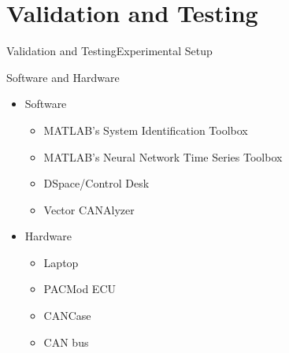 \documentclass{beamer}
\begin{document}
\section{Validation and Testing}

\begin{frame}{Validation and Testing}{Experimental Setup}
  \begin{block}{Software and Hardware}
 \begin{itemize}
        \item Software
        \begin{itemize}
	        \small
	        \item MATLAB's System Identification Toolbox
	        \item MATLAB's Neural Network Time Series Toolbox
	        \item DSpace/Control Desk
	        \item Vector CANAlyzer
        \end{itemize}
	\item Hardware
	\begin{itemize}
		\small
		\item Laptop
		\item PACMod ECU
		\item CANCase 
		\item CAN bus
	\end{itemize}
\end{itemize}
  \end{block}
\end{frame}
\end{document}
